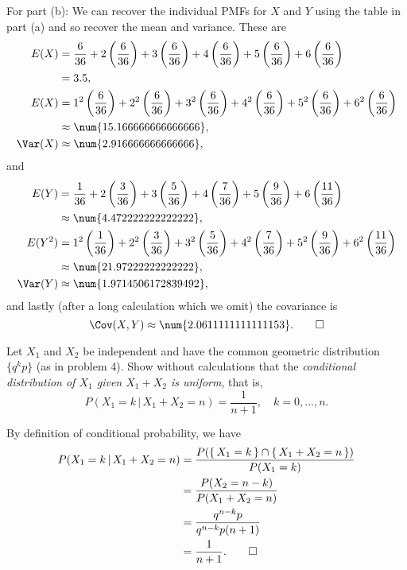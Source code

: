 \begin{solution}
  For part (b): We can recover the individual PMFs for \(X\) and \(Y\)
  using the table in part (a) and so recover the mean and variance. These
  are
  \begin{align*}
    E(X)&=\frac{6}{36}%
          +2\left(\frac{6}{36}\right)%
          +3\left(\frac{6}{36}\right)%
          +4\left(\frac{6}{36}\right)%
          +5\left(\frac{6}{36}\right)%
          +6\left(\frac{6}{36}\right)\\
        &=3.5,\\
    E(X)&=1^2\left(\frac{6}{36}\right)%
          +2^2\left(\frac{6}{36}\right)%
          +3^2\left(\frac{6}{36}\right)%
          +4^2\left(\frac{6}{36}\right)%
          +5^2\left(\frac{6}{36}\right)%
          +6^2\left(\frac{6}{36}\right)\\
        &\approx\num{15.166666666666666},\\
    \Var(X)&\approx\num{2.916666666666666},
  \end{align*}
  and
  \begin{align*}
    E(Y)&=\frac{1}{36}%
          +2\left(\frac{3}{36}\right)%
          +3\left(\frac{5}{36}\right)%
          +4\left(\frac{7}{36}\right)%
          +5\left(\frac{9}{36}\right)%
          +6\left(\frac{11}{36}\right)\\
        &\approx\num{4.472222222222222},\\
    E(Y^2)&=1^2\left(\frac{1}{36}\right)%
          +2^2\left(\frac{3}{36}\right)%
          +3^2\left(\frac{5}{36}\right)%
          +4^2\left(\frac{7}{36}\right)%
          +5^2\left(\frac{9}{36}\right)%
          +6^2\left(\frac{11}{36}\right)\\
        &\approx\num{21.97222222222222},\\
    \Var(Y)&\approx\num{1.9714506172839492},
  \end{align*}
  and lastly (after a long calculation which we omit) the covariance is
  \[
    \Cov(X,Y)\approx\num{2.0611111111111153}.\qedhere
  \]
\end{solution}
\newpage

\begin{problem}[Handout 15, \# 19]
  Let \(X_1\) and \(X_2\) be independent and have the common geometric
  distribution \(\{q^kp\}\) (as in problem 4). Show without calculations
  that the \emph{conditional distribution of \(X_1\) given \(X_1+X_2\) is
    uniform}, that is,
  \begin{equation}
    \label{eq:12:uniform-conditional-pmf}
    P(X_1=k\,|\,X_1+X_2=n)=\frac{1}{n+1},\quad k=0,\dotsc,n.
  \end{equation}
\end{problem}
\begin{solution}
  By definition of conditional probability, we have
  \begin{align*}
    P(X_1=k\,|\,X_1+X_2=n)
    &=\frac{P(\{\,X_1=k\,\}\cap\{\,X_1+X_2=n\,\})}{P(X_1=k)}\\
    &=\frac{P(X_2=n-k)}{P(X_1+X_2=n)}\\
    &=\frac{q^{n-k}p}{q^{n-k}p(n+1)}\\
    &=\frac{1}{n+1}.\qedhere
  \end{align*}
\end{solution}
\newpage

